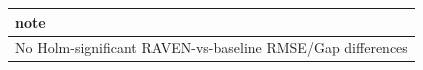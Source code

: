 \begin{tabular}{l}
\toprule
note \\
\midrule
No Holm-significant RAVEN-vs-baseline RMSE/Gap differences \\
\bottomrule
\end{tabular}
